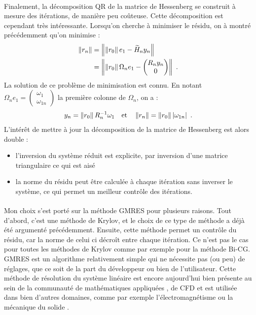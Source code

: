 		\paragraph{}
		Finalement, la décomposition QR de la matrice de Hessenberg se construit à mesure des itérations, de manière peu coûteuse.
		Cette décomposition est cependant très intéressante.
		Lorsqu'on cherche à minimiser le résidu, on à montré précédemment qu'on minimise :
		\begin{align*}
			\norm{r_n} &= \norm{\norm{r_0} e_1 - \widetilde{H}_ny_n} \\
			&= \norm{\norm{r_0} \Omega_ne_1 - \begin{pmatrix}R_ny_n \\ 0\end{pmatrix}}\ .
		\end{align*}
		La solution de ce problème de minimisation est connu.
		En notant $\Omega_ne_1 = \begin{pmatrix}\omega_1 \\ \omega_{1n}\end{pmatrix}$ la première colonne de $\Omega_n$, on a :
		\[y_n = \norm{r_0}R_n^{-1}\omega_1\quad\textrm{et}\quad\norm{r_n} = \norm{r_0}\left|\omega_{1n}\right|\ .\]
		L'intérêt de mettre à jour la décomposition de la matrice de Hessenberg est alors double :
		\begin{itemize}
			\item l'inversion du système réduit est explicite, par inversion d'une matrice triangulaire ce qui est aisé
			\item la norme du résidu peut être calculée à chaque itération sans inverser le système, ce qui permet un meilleur contrôle des itérations.
		\end{itemize}

		\paragraph{}
		Mon choix s'est porté sur la méthode GMRES pour plusieurs raisons.
		Tout d'abord, c'est une méthode de Krylov, et le choix de ce type de méthode a déjà été argumenté précédemment.
		Ensuite, cette méthode permet un contrôle du résidu, car la norme de celui ci décroît entre chaque itération.
		Ce n'est pas le cas pour toutes les méthodes de Krylov comme par exemple pour la méthode Bi-CG.
		GMRES est un algorithme relativement simple qui ne nécessite pas (ou peu) de réglages, que ce soit de la part du développeur ou bien de l'utilisateur.
		Cette méthode de résolution du système linéaire est encore aujourd'hui bien présente au sein de la communauté de mathématiques appliquées \cite{Vasseur2016}, de CFD \cite{FrancoCamierAndrejEtAl2020} et est utilisée dans bien d'autres domaines, comme par exemple l'électromagnétisme \cite{ErnstGander2012} ou la mécanique du solide \cite{Mercier2015}.


